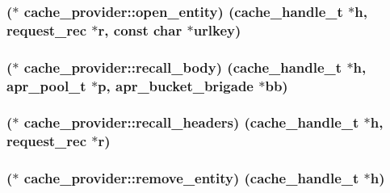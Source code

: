 \subsubsection[{\texorpdfstring{open\+\_\+entity}{open_entity}}]{($\ast$ cache\+\_\+provider\+::open\+\_\+entity) ({\bf cache\+\_\+handle\+\_\+t} $\ast${\bf h}, {\bf request\+\_\+rec} $\ast${\bf r}, const char $\ast$urlkey)}\hypertarget{structcache__provider_ac99f3fba4c7e207f7a121443f16afe18}{}\label{structcache__provider_ac99f3fba4c7e207f7a121443f16afe18}
\subsubsection[{\texorpdfstring{recall\+\_\+body}{recall_body}}]{($\ast$ cache\+\_\+provider\+::recall\+\_\+body) ({\bf cache\+\_\+handle\+\_\+t} $\ast${\bf h}, {\bf apr\+\_\+pool\+\_\+t} $\ast${\bf p}, {\bf apr\+\_\+bucket\+\_\+brigade} $\ast${\bf bb})}\hypertarget{structcache__provider_a5d5b5b635758c92cbcd279a5f55992a5}{}\label{structcache__provider_a5d5b5b635758c92cbcd279a5f55992a5}
\subsubsection[{\texorpdfstring{recall\+\_\+headers}{recall_headers}}]{($\ast$ cache\+\_\+provider\+::recall\+\_\+headers) ({\bf cache\+\_\+handle\+\_\+t} $\ast${\bf h}, {\bf request\+\_\+rec} $\ast${\bf r})}\hypertarget{structcache__provider_a1ebbc419cb9f93c27620e0fe993dbd18}{}\label{structcache__provider_a1ebbc419cb9f93c27620e0fe993dbd18}
\subsubsection[{\texorpdfstring{remove\+\_\+entity}{remove_entity}}]{($\ast$ cache\+\_\+provider\+::remove\+\_\+entity) ({\bf cache\+\_\+handle\+\_\+t} $\ast${\bf h})}\hypertarget{structcache__provider_ab540cebf28984e6aff448b836a67a7a5}{}\label{structcache__provider_ab540cebf28984e6aff448b836a67a7a5}
